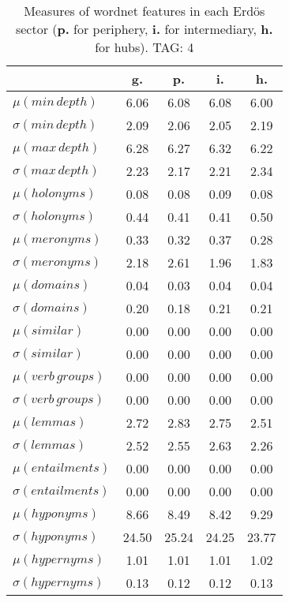 \begin{table}[h!]
\begin{center}
\begin{tabular}{| l | c | c | c | c |}\hline
 & g. & p. & i. & h. \\\hline
$\mu(min\,depth)$ & 6.06  & 6.08  & 6.08  & 6.00 \\\hline
$\sigma(min\,depth)$ & 2.09  & 2.06  & 2.05  & 2.19 \\\hline
$\mu(max\,depth)$ & 6.28  & 6.27  & 6.32  & 6.22 \\\hline
$\sigma(max\,depth)$ & 2.23  & 2.17  & 2.21  & 2.34 \\\hline
$\mu(holonyms)$ & 0.08  & 0.08  & 0.09  & 0.08 \\\hline
$\sigma(holonyms)$ & 0.44  & 0.41  & 0.41  & 0.50 \\\hline
$\mu(meronyms)$ & 0.33  & 0.32  & 0.37  & 0.28 \\\hline
$\sigma(meronyms)$ & 2.18  & 2.61  & 1.96  & 1.83 \\\hline
$\mu(domains)$ & 0.04  & 0.03  & 0.04  & 0.04 \\\hline
$\sigma(domains)$ & 0.20  & 0.18  & 0.21  & 0.21 \\\hline
$\mu(similar)$ & 0.00  & 0.00  & 0.00  & 0.00 \\\hline
$\sigma(similar)$ & 0.00  & 0.00  & 0.00  & 0.00 \\\hline
$\mu(verb\,groups)$ & 0.00  & 0.00  & 0.00  & 0.00 \\\hline
$\sigma(verb\,groups)$ & 0.00  & 0.00  & 0.00  & 0.00 \\\hline
$\mu(lemmas)$ & 2.72  & 2.83  & 2.75  & 2.51 \\\hline
$\sigma(lemmas)$ & 2.52  & 2.55  & 2.63  & 2.26 \\\hline
$\mu(entailments)$ & 0.00  & 0.00  & 0.00  & 0.00 \\\hline
$\sigma(entailments)$ & 0.00  & 0.00  & 0.00  & 0.00 \\\hline
$\mu(hyponyms)$ & 8.66  & 8.49  & 8.42  & 9.29 \\\hline
$\sigma(hyponyms)$ & 24.50  & 25.24  & 24.25  & 23.77 \\\hline
$\mu(hypernyms)$ & 1.01  & 1.01  & 1.01  & 1.02 \\\hline
$\sigma(hypernyms)$ & 0.13  & 0.12  & 0.12  & 0.13 \\\hline
\end{tabular}
\caption{Measures of wordnet features in each Erd\"os sector ({{\bf p.}} for periphery, {{\bf i.}} for intermediary, {{\bf h.}} for hubs). TAG: 4}
\end{center}
\end{table}